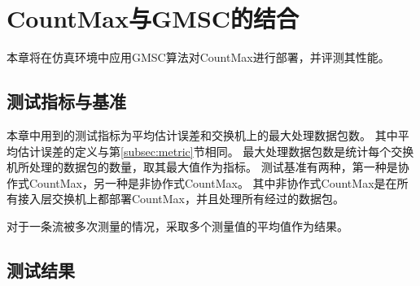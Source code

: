 \chapter{CountMax与GMSC的结合}
本章将在仿真环境中应用GMSC算法对CountMax进行部署，并评测其性能。
\section{测试指标与基准}
本章中用到的测试指标为平均估计误差和交换机上的最大处理数据包数。
其中平均估计误差的定义与第\ref{subsec:metric}节相同。
最大处理数据包数是统计每个交换机所处理的数据包的数量，取其最大值作为指标。
测试基准有两种，第一种是协作式CountMax，另一种是非协作式CountMax。
其中非协作式CountMax是在所有接入层交换机上都部署CountMax，并且处理所有经过的数据包。

对于一条流被多次测量的情况，采取多个测量值的平均值作为结果。

\section{测试结果}
